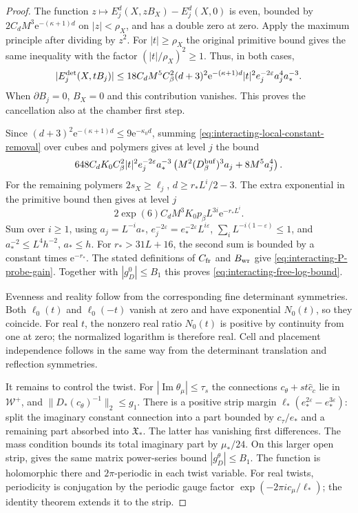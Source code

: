 \documentclass[11pt,letterpaper,reqno]{amsart}
\begin{document}
\begin{proof}
The function
$z\mapsto E_j^d(X,zB_X)-E_j^d(X,0)$ is even,
bounded by $2C_dM^3\mathrm e^{-(\kappa+1)d}$ on
$|z|<\rho_X$, and has a double zero at zero.
Apply the maximum principle after dividing
by $z^2$. For $|t|\ge\rho_X$ the original
primitive bound gives the same inequality
with the factor $(|t|/\rho_X)^2\ge1$.
Thus, in both cases,
\begin{equation}\label{eq:interacting-local-constant-removal}
 |E_j^{\rm det}(X,tB_j)|\le
 18C_dM^5C_\beta^2(d+3)^2\mathrm e^{-(\kappa+1)d}
          |t|^2e_j^{-2\varepsilon}a_j^4a_*^{-3}.
\end{equation}
When $\partial B_j=0$, $B_X=0$ and this contribution
vanishes. This proves the cancellation also
at the chamber first step.

Since $(d+3)^2\mathrm e^{-(\kappa+1)d}\le9\mathrm e^{-\kappa_0d}$,
summing \eqref{eq:interacting-local-constant-removal}
over cubes and polymers gives at level $j$
the bound
\[
 648C_dK_0C_\beta^2|t|^2e_j^{-2\varepsilon}a_*^{-3}
           \left(M^2(D_\beta^{\rm buf})^3a_j+8M^5a_j^4\right).
\]
For the remaining polymers $2s_X\ge\ell_j$,
$d\ge r_*L^i/2-3$. The extra exponential in
the primitive bound then gives at level $j$
\[
 2\exp(6)C_dM^3K_0p_\beta L^{3i}\mathrm e^{-r_*L^i}.
\]
Sum over $i\ge1$, using $a_j=L^{-i}a_*$,
$e_j^{-2\varepsilon}=e_*^{-2\varepsilon}L^{i\varepsilon}$,
$\sum_iL^{-i(1-\varepsilon)}\le1$, and
$a_*^{-2}\le L^4h^{-2}$, $a_*\le h$.
For $r_*>31L+16$, the second sum is bounded
by a constant times $\mathrm e^{-r_*}$.
The stated definitions of $C_{\rm fr}$ and
$B_{\rm wr}$ give \eqref{eq:interacting-P-probe-gain}.
Together with $|g_D^0|\le B_1$ this proves
\eqref{eq:interacting-free-log-bound}.

Evenness and reality follow from the corresponding
fine determinant symmetries. Both $\ell_0(t)$
and $\ell_0(-t)$ vanish at zero and have
exponential $N_0(t)$, so they coincide.
For real $t$, the nonzero real ratio $N_0(t)$
is positive by continuity from one at zero;
the normalized logarithm is therefore real.
Cell and placement independence follows in
the same way from the determinant translation
and reflection symmetries.

It remains to control the twist. For
$|\operatorname{Im}\theta_\mu|\le\tau_s$
the connections $c_\theta+st\widehat c_c$
lie in $\mathcal W^+$, and
$\|D_*(c_\theta)^{-1}\|_2\le g_1$.
There is a positive strip margin
$\ell_*(e_*^{2\varepsilon}-e_*^{3\varepsilon})$:
split the imaginary constant connection
into a part bounded by $c_\tau/e_*$ and a
remaining part absorbed into $\mathfrak X_*$.
The latter has vanishing first differences.
The mass condition bounds its total imaginary
part by $\mu_*/24$. On this larger open strip,
\cite[(73)]{TerminalPressure} gives
the same matrix power-series bound $|g_D^\theta|\le B_1$.
The function is holomorphic there and
$2\pi$-periodic in each twist variable.
For real twists, periodicity is conjugation by
the periodic gauge factor
$\exp(-2\pi i c_\mu/\ell_*)$; the identity
theorem extends it to the strip.


\end{proof}
\end{document}
